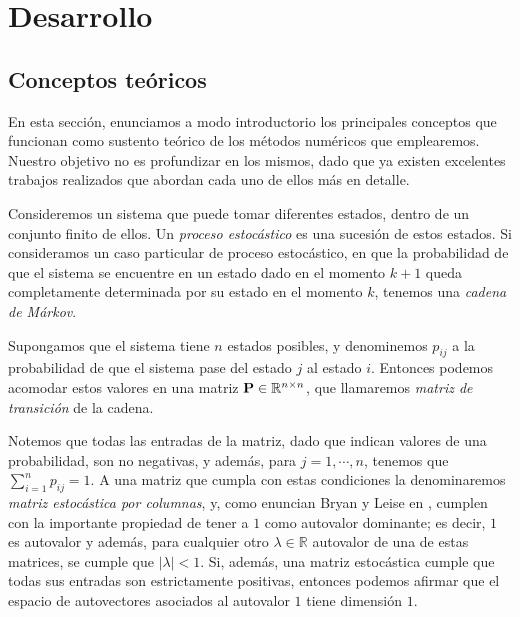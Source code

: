 \section{Desarrollo}

    \subsection{Conceptos teóricos}

        En esta sección, enunciamos a modo introductorio los principales conceptos que funcionan como sustento teórico de los métodos numéricos que emplearemos. Nuestro objetivo no es profundizar en los mismos, dado que ya existen excelentes trabajos realizados que abordan cada uno de ellos más en detalle.

        Consideremos un sistema que puede tomar diferentes estados, dentro de un conjunto finito de ellos. Un \emph{proceso estocástico} es una sucesión de estos estados. Si consideramos un caso particular de proceso estocástico, en que la probabilidad de que el sistema se encuentre en un estado dado en el momento $k+1$ queda completamente determinada por su estado en el momento $k$, tenemos una \emph{cadena de Márkov}.

        Supongamos que el sistema tiene $n$ estados posibles, y denominemos $p_{ij}$ a la probabilidad de que el sistema pase del estado $j$ al estado $i$. Entonces podemos acomodar estos valores en una matriz $\mathbf{P} \in \mathbb{R}^{n \times n}$, que llamaremos \emph{matriz de transición} de la cadena.

        Notemos que todas las entradas de la matriz, dado que indican valores de una probabilidad, son no negativas, y además, para $j = 1, \cdots, n$, tenemos que $\sum_{i=1}^{n} p_{ij} = 1$. A una matriz que cumpla con estas condiciones la denominaremos \emph{matriz estocástica por columnas}, y, como enuncian Bryan y Leise en \cite{Bryan2006}, cumplen con la importante propiedad de tener a $1$ como autovalor dominante; es decir, $1$ es autovalor y además, para cualquier otro $\lambda \in \mathbb{R}$ autovalor de una de estas matrices, se cumple que $|\lambda| < 1$. Si, además, una matriz estocástica cumple que todas sus entradas son estrictamente positivas, entonces podemos afirmar que el espacio de autovectores asociados al autovalor $1$ tiene dimensión $1$.

